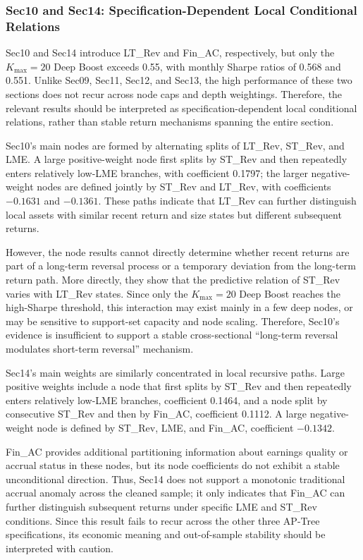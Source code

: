 \documentclass[12pt]{article}
\begin{document}
\subsubsection{Sec10 and Sec14: Specification-Dependent Local Conditional Relations}

Sec10 and Sec14 introduce LT\_Rev and Fin\_AC, respectively, but only the \(K_{\max}=20\) Deep Boost exceeds 0.55, with monthly Sharpe ratios of 0.568 and 0.551. Unlike Sec09, Sec11, Sec12, and Sec13, the high performance of these two sections does not recur across node caps and depth weightings. Therefore, the relevant results should be interpreted as specification-dependent local conditional relations, rather than stable return mechanisms spanning the entire section.

Sec10's main nodes are formed by alternating splits of LT\_Rev, ST\_Rev, and LME. A large positive-weight node first splits by ST\_Rev and then repeatedly enters relatively low-LME branches, with coefficient 0.1797; the larger negative-weight nodes are defined jointly by ST\_Rev and LT\_Rev, with coefficients \(-0.1631\) and \(-0.1361\). These paths indicate that LT\_Rev can further distinguish local assets with similar recent return and size states but different subsequent returns.

However, the node results cannot directly determine whether recent returns are part of a long-term reversal process or a temporary deviation from the long-term return path. More directly, they show that the predictive relation of ST\_Rev varies with LT\_Rev states. Since only the \(K_{\max}=20\) Deep Boost reaches the high-Sharpe threshold, this interaction may exist mainly in a few deep nodes, or may be sensitive to support-set capacity and node scaling. Therefore, Sec10's evidence is insufficient to support a stable cross-sectional ``long-term reversal modulates short-term reversal'' mechanism.

Sec14's main weights are similarly concentrated in local recursive paths. Large positive weights include a node that first splits by ST\_Rev and then repeatedly enters relatively low-LME branches, coefficient 0.1464, and a node split by consecutive ST\_Rev and then by Fin\_AC, coefficient 0.1112. A large negative-weight node is defined by ST\_Rev, LME, and Fin\_AC, coefficient \(-0.1342\).

Fin\_AC provides additional partitioning information about earnings quality or accrual status in these nodes, but its node coefficients do not exhibit a stable unconditional direction. Thus, Sec14 does not support a monotonic traditional accrual anomaly across the cleaned sample; it only indicates that Fin\_AC can further distinguish subsequent returns under specific LME and ST\_Rev conditions. Since this result fails to recur across the other three AP-Tree specifications, its economic meaning and out-of-sample stability should be interpreted with caution.
\end{document}
